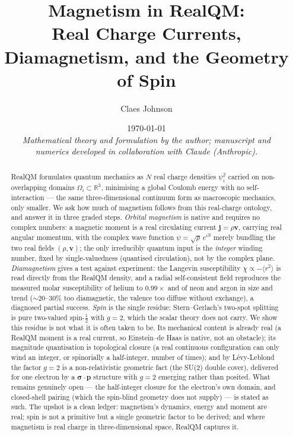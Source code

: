 \documentclass[11pt]{article}
\title{Magnetism in RealQM:\\ Real Charge Currents, Diamagnetism, and the Geometry of Spin}
\author[1]{Claes Johnson}
\affil[1]{KTH Royal Institute of Technology, Stockholm, Sweden \\
\texttt{claesjohnson@gmail.com}}
\date{\today \\[0.4em]
\small\textit{Mathematical theory and formulation by the author; manuscript and} \\
\small\textit{numerics developed in collaboration with Claude (Anthropic).}}
\begin{document}
\maketitle

\begin{abstract}
RealQM formulates quantum mechanics as $N$ real charge densities $\psi_i^2$ carried on non-overlapping domains
$\Omega_i\subset\mathbb R^3$, minimising a global Coulomb energy with no self-interaction --- the same
three-dimensional continuum form as macroscopic mechanics, only smaller. We ask how much of magnetism follows
from this real-charge ontology, and answer it in three graded steps. \emph{Orbital magnetism} is native and
requires no complex numbers: a magnetic moment is a real circulating current $\mathbf j=\rho\mathbf v$, carrying
real angular momentum, with the complex wave function $\psi=\sqrt\rho\,e^{iS}$ merely bundling the two real
fields $(\rho,\mathbf v)$; the only irreducibly quantum input is the \emph{integer} winding number, fixed by
single-valuedness (quantised circulation), not by the complex plane. \emph{Diamagnetism} gives a test against
experiment: the Langevin susceptibility $\chi\propto-\langle r^2\rangle$ is read directly from the RealQM density,
and a radial self-consistent field reproduces the measured molar susceptibility of helium to $0.99\times$ and of
neon and argon in size and trend ($\sim$20--30\% too diamagnetic, the valence too diffuse without exchange), a
diagnosed partial success. \emph{Spin} is the single residue: Stern--Gerlach's two-spot splitting is pure
two-valued spin-$\tfrac12$ with $g=2$, which the scalar theory does not carry. We show this residue is not what it
is often taken to be. Its mechanical content is already real (a RealQM moment is a real current, so Einstein--de
Haas is native, not an obstacle); its magnitude quantisation is topological closure (a real continuous
configuration can only wind an integer, or spinorially a half-integer, number of times); and by Lévy-Leblond the
factor $g=2$ is a non-relativistic geometric fact (the SU(2) double cover), delivered for one electron by a
$\boldsymbol\sigma\!\cdot\!\mathbf p$ structure with $g=2$ emerging rather than posited. What remains genuinely
open --- the half-integer closure for the electron's own domain, and closed-shell pairing (which the spin-blind
geometry does not supply) --- is stated as such. The upshot is a clean ledger: magnetism's dynamics, energy and
moment are real; spin is not a primitive but a single geometric factor to be derived; and where magnetism is real
charge in three-dimensional space, RealQM captures it.
\end{abstract}
\end{document}
